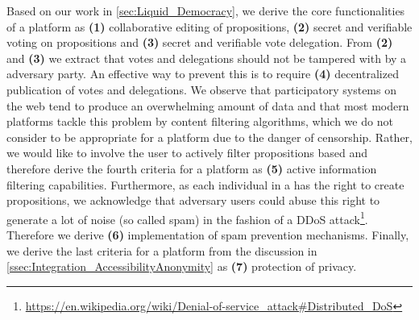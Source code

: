 Based on our work in \ref{sec:Liquid_Democracy}, we derive the core functionalities of a  platform as \textbf{(1)} collaborative editing of propositions, \textbf{(2)} secret and verifiable voting on propositions and \textbf{(3)} secret and verifiable vote delegation.
From \textbf{(2)} and \textbf{(3)} we extract that votes and delegations should not be tampered with by a adversary party.
An effective way to prevent this is to require \textbf{(4)} decentralized publication of votes and delegations.
We observe that participatory systems on the web tend to produce an overwhelming amount of data and that most modern platforms tackle this problem by content filtering algorithms, which we do not consider to be appropriate for a  platform due to the danger of censorship.
Rather, we would like to involve the user to actively filter propositions based and therefore derive the fourth criteria for a  platform as \textbf{(5)} active information filtering capabilities.
Furthermore, as each individual in a  has the right to create propositions, we acknowledge that adversary users could abuse this right to generate a lot of noise (so called spam) in the fashion of a DDoS attack\footnote{\url{https://en.wikipedia.org/wiki/Denial-of-service_attack\#Distributed_DoS}}. Therefore we derive \textbf{(6)} implementation of spam prevention mechanisms.
Finally, we derive the last criteria for a  platform from the discussion in \ref{ssec:Integration_AccessibilityAnonymity} as \textbf{(7)} protection of privacy.

